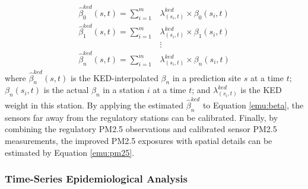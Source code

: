 \documentclass[11pt]{article}
\begin{document}
\begin{align}
\label{emu:ked}
\begin{split}
\hat{\beta}^{ked}_0(s,t)=\sum_{i=1}^m&\lambda^{ked}_{(s_i,t)}\times\beta_0(s_i,t) \\
\hat{\beta}^{ked}_1(s,t)=\sum_{i=1}^m&\lambda^{ked}_{(s_i,t)}\times\beta_1(s_i,t) \\
&\vdots \\
\hat{\beta}^{ked}_n(s,t)=\sum_{i=1}^m&\lambda^{ked}_{(s_i,t)}\times\beta_n(s_i,t) 
\end{split}
\end{align}
where $\hat{\beta}^{ked}_n(s,t)$ is the KED-interpolated $\beta_n$ in a prediction site $s$ at a time $t$; $\beta_n(s_i,t)$ is the actual $\beta_n$ in a station $i$ at a time $t$; and $\lambda^{ked}_{(s_i,t)}$ is the KED weight in this station. By applying the estimated $\hat{\beta}^{ked}_n$ to Equation \ref{emu:beta}, the sensors far away from the regulatory stations can be calibrated. Finally, by combining the regulatory PM2.5 observations and calibrated sensor PM2.5 measurements, the improved PM2.5 exposures with spatial details can be estimated by Equation \ref{emu:pm25}.

\subsubsection{Time-Series Epidemiological Analysis}
\end{document}
